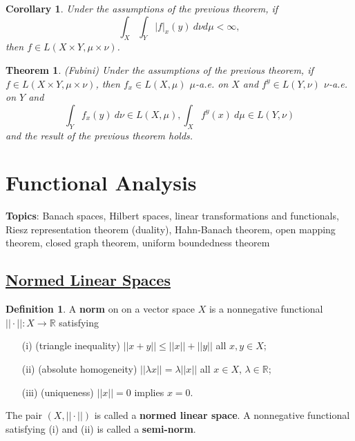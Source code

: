 \documentclass[11pt]{amsart}
\newtheorem*{theorem*}{Theorem}
\newtheorem*{corollary*}{Corollary}
\theoremstyle{definition}
\newtheorem*{definition*}{Definition}
\renewcommand\leq{\leqslant}
\renewcommand\:{\colon}
\newcommand{\R}{\mathds{R}}
\newcommand{\dmu}{\ d\mu}
\begin{document}
\begin{corollary*}
	Under the assumptions of the previous theorem, if
		\[ \int_X \int_Y |f|_x (y) \ d\nu d\mu < \infty, \]
	then $f \in L(X \times Y, \mu \times \nu)$.
\end{corollary*}

\begin{theorem*}
	\textnormal{(Fubini)} Under the assumptions of the previous theorem, if $f \in L(X \times Y, \mu \times \nu)$, then $f_x \in L(X, \mu)$ $\mu$-a.e. on $X$ and $f^y \in L(Y, \nu)$ $\nu$-a.e. on $Y$ and 
		\[ \int_Y f_x(y) \ d\nu \in L(X, \mu), \int_X f^y(x) \dmu \in L(Y, \nu) \]
	and the result of the previous theorem holds.
\end{theorem*}
\clearpage






\section{Functional Analysis}

\noindent \textbf{Topics}: Banach spaces, Hilbert spaces, linear transformations and functionals, Riesz representation theorem (duality), Hahn-Banach theorem, open mapping theorem, closed graph theorem, uniform boundedness theorem
\vskip30pt



\subsection*{\underline{Normed Linear Spaces}}

\begin{definition*}
	A \textbf{norm} on on a vector space $X$ is a nonnegative functional $|| \cdot ||\: X \to \R$ satisfying
	\begin{itemize}[leftmargin=32.5pt]\setlength\itemsep{0em}
		\item[(i)] (triangle inequality) $||x + y|| \leq ||x|| + ||y||$ all $x,y \in X$;
		\item[(ii)] (absolute homogeneity) $||\lambda x|| = \lambda||x||$ all $x \in X$, $\lambda \in \R$;
		\item[(iii)] (uniqueness) $||x|| = 0$ implies $x = 0$.
	\end{itemize}
	The pair $(X, ||\cdot||)$ is called a \textbf{normed linear space}. A nonnegative functional satisfying (i) and (ii) is called a \textbf{semi-norm}. 
\end{definition*}
\end{document}
